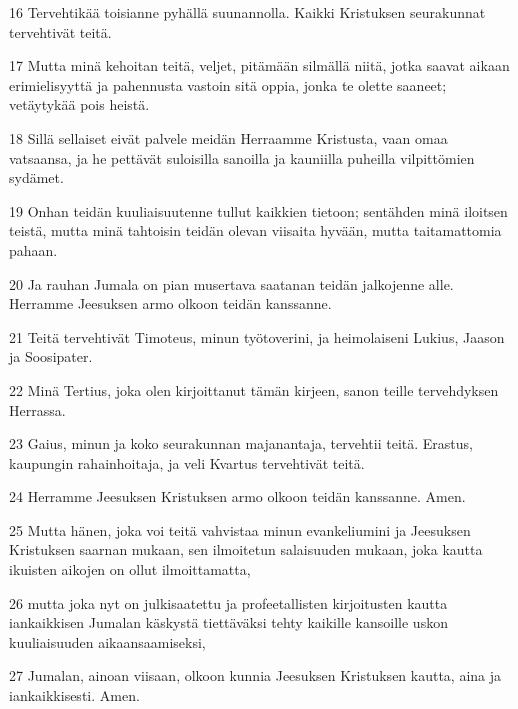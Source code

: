 \par 16 Tervehtikää toisianne pyhällä suunannolla. Kaikki Kristuksen seurakunnat tervehtivät teitä.
\par 17 Mutta minä kehoitan teitä, veljet, pitämään silmällä niitä, jotka saavat aikaan erimielisyyttä ja pahennusta vastoin sitä oppia, jonka te olette saaneet; vetäytykää pois heistä.
\par 18 Sillä sellaiset eivät palvele meidän Herraamme Kristusta, vaan omaa vatsaansa, ja he pettävät suloisilla sanoilla ja kauniilla puheilla vilpittömien sydämet.
\par 19 Onhan teidän kuuliaisuutenne tullut kaikkien tietoon; sentähden minä iloitsen teistä, mutta minä tahtoisin teidän olevan viisaita hyvään, mutta taitamattomia pahaan.
\par 20 Ja rauhan Jumala on pian musertava saatanan teidän jalkojenne alle. Herramme Jeesuksen armo olkoon teidän kanssanne.
\par 21 Teitä tervehtivät Timoteus, minun työtoverini, ja heimolaiseni Lukius, Jaason ja Soosipater.
\par 22 Minä Tertius, joka olen kirjoittanut tämän kirjeen, sanon teille tervehdyksen Herrassa.
\par 23 Gaius, minun ja koko seurakunnan majanantaja, tervehtii teitä. Erastus, kaupungin rahainhoitaja, ja veli Kvartus tervehtivät teitä.
\par 24 Herramme Jeesuksen Kristuksen armo olkoon teidän kanssanne. Amen.
\par 25 Mutta hänen, joka voi teitä vahvistaa minun evankeliumini ja Jeesuksen Kristuksen saarnan mukaan, sen ilmoitetun salaisuuden mukaan, joka kautta ikuisten aikojen on ollut ilmoittamatta,
\par 26 mutta joka nyt on julkisaatettu ja profeetallisten kirjoitusten kautta iankaikkisen Jumalan käskystä tiettäväksi tehty kaikille kansoille uskon kuuliaisuuden aikaansaamiseksi,
\par 27 Jumalan, ainoan viisaan, olkoon kunnia Jeesuksen Kristuksen kautta, aina ja iankaikkisesti. Amen.


